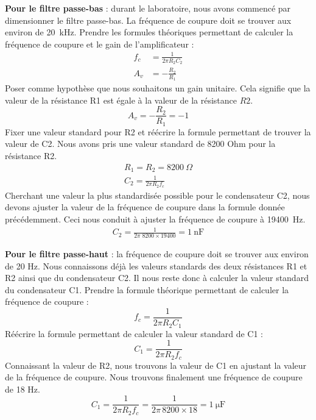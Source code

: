 \documentclass[10pt, oneside, a4paper]{article}
\begin{document}
\noindent\textbf{Pour le filtre passe-bas} : durant le laboratoire, nous avons commencé par
dimensionner le filtre passe-bas.
La fréquence de coupure doit se trouver aux environ de \SI{20}{\kilo\hertz}.
Prendre les formules théoriques permettant de calculer la fréquence de coupure
et le gain de l'amplificateur :
\begin{align}
    f_c &= \frac{1}{2\pi R_2 C_2} \\[2mm]
    A_v &= -\frac{R_2}{R_1}
\end{align}
Poser comme hypothèse que nous souhaitons un gain unitaire.
Cela signifie que la valeur de la résistance R1 est égale à la valeur
de la résistance $R2$.
\begin{equation}
    A_v = - \frac{R_2}{R_1} = -1
\end{equation}
Fixer une valeur standard pour R2 et réécrire la formule permettant de trouver
la valeur de C2.
Nous avons pris une valeur standard de 8200 Ohm pour la résistance R2.
\begin{gather}
    R_1 = R_2 = \SI{8200}{\Omega} \\
    C_2 = \frac{1}{2\pi R_2 f_c}
\end{gather}
Cherchant une valeur la plus standardisée possible pour le condensateur C2, nous
devons ajuster la valeur de la fréquence de coupure dans la formule donnée précédemment.
Ceci nous conduit à ajuster la fréquence de coupure à \SI{19400}{\hertz}.
\begin{gather}
    C_2 = \frac{1}{2\pi\;8200\times19400} = \SI{1}{\nano\farad}
\end{gather}

\noindent\textbf{Pour le filtre passe-haut} : la fréquence de coupure doit se trouver aux environ
de 20 Hz.
Nous connaissons déjà les valeurs standards des deux résistances R1 et R2 ainsi que
du condensateur C2.
Il nous reste donc à calculer la valeur standard du condensateur C1.
Prendre la formule théorique permettant de calculer la fréquence de coupure :
\begin{equation}
    f_c = \frac{1}{2\pi R_2 C_1}
\end{equation}
Réécrire la formule permettant de calculer la valeur standard de C1 :
\begin{equation}
    C_1 = \frac{1}{2\pi R_2 f_c}
\end{equation}
Connaissant la valeur de R2, nous trouvons la valeur de C1 en ajustant la valeur
de la fréquence de coupure.
Nous trouvons finalement une fréquence de coupure de 18 Hz.
\begin{equation}
    C_1 = \frac{1}{2\pi R_2 f_c} = \frac{1}{2\pi\,8200\times18} = \SI{1}{\micro\farad}
\end{equation}
\end{document}
